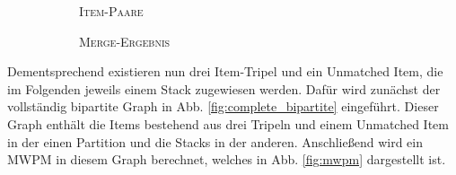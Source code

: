 \begin{figure}[H]
\centering
\begin{subfigure}[b]{0.4\textwidth}
\centering
{}
\caption{\textsc{Item-Paare}}
\label{fig:item_pairs}
\end{subfigure}
\hspace{10pt}
\begin{subfigure}[b]{0.4\textwidth}
\centering
{}
\caption{\textsc{Merge-Ergebnis}}
\label{fig:merge_result}
\end{subfigure}
\caption{}
\label{fig:merge_step}
\end{figure}

Dementsprechend existieren nun drei Item-Tripel und ein Unmatched Item, die im Folgenden jeweils einem Stack zugewiesen werden.
Dafür wird zunächst der vollständig bipartite Graph in Abb. \ref{fig:complete_bipartite} eingeführt.
Dieser Graph enthält die Items bestehend aus drei Tripeln und einem Unmatched Item in der einen Partition
und die Stacks in der anderen. Anschließend wird ein \textsc{MWPM} in diesem Graph berechnet, welches
in Abb. \ref{fig:mwpm} dargestellt ist.

